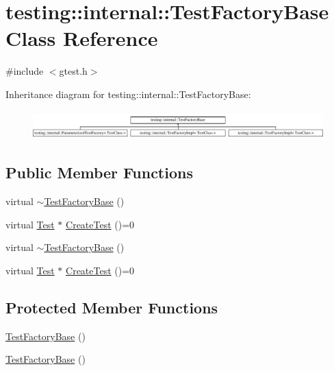 \hypertarget{classtesting_1_1internal_1_1_test_factory_base}{\section{testing\-:\-:internal\-:\-:Test\-Factory\-Base Class Reference}
\label{classtesting_1_1internal_1_1_test_factory_base}
}


{\ttfamily \#include $<$gtest.\-h$>$}

Inheritance diagram for testing\-:\-:internal\-:\-:Test\-Factory\-Base\-:\begin{figure}[H]
\begin{center}
\leavevmode
\includegraphics[height=1.111111cm]{classtesting_1_1internal_1_1_test_factory_base}
\end{center}
\end{figure}
\subsection*{Public Member Functions}
\begin{DoxyCompactItemize}
\item 
virtual \hyperlink{classtesting_1_1internal_1_1_test_factory_base_a18f22a7594336a36642289c1decddc9e}{$\sim$\-Test\-Factory\-Base} ()
\item 
virtual \hyperlink{classtesting_1_1_test}{Test} $\ast$ \hyperlink{classtesting_1_1internal_1_1_test_factory_base_a07ac3ca0b196cdb092da0bb186b7c030}{Create\-Test} ()=0
\item 
virtual \hyperlink{classtesting_1_1internal_1_1_test_factory_base_a18f22a7594336a36642289c1decddc9e}{$\sim$\-Test\-Factory\-Base} ()
\item 
virtual \hyperlink{classtesting_1_1_test}{Test} $\ast$ \hyperlink{classtesting_1_1internal_1_1_test_factory_base_a07ac3ca0b196cdb092da0bb186b7c030}{Create\-Test} ()=0
\end{DoxyCompactItemize}
\subsection*{Protected Member Functions}
\begin{DoxyCompactItemize}
\item 
\hyperlink{classtesting_1_1internal_1_1_test_factory_base_afedbf147b2a213517b315880d8c81427}{Test\-Factory\-Base} ()
\item 
\hyperlink{classtesting_1_1internal_1_1_test_factory_base_afedbf147b2a213517b315880d8c81427}{Test\-Factory\-Base} ()
\end{DoxyCompactItemize}


